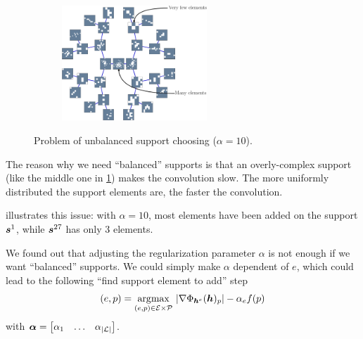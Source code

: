 \begin{figure}[!ht] \centering
\begin{subfigure}[b]{1\textwidth}\centering
\includegraphics[width=0.6\textwidth]{figures/tree-unbalanced-supp/tree-unbalanced.pdf}
\end{subfigure}
\caption{Problem of unbalanced support choosing ($\alpha=10$).}\label{fig_unbalanced_supports}
\end{figure}


\noindent
The reason why we need “balanced” supports is that an overly-complex support (like the middle one in \cref{fig_unbalanced_supports}) makes the convolution slow. The more uniformly distributed the support elements are, the faster the convolution.


\noindent
{} illustrates this issue: with $\alpha=10$, most elements have been added on the support $\bm{s}^1$, while $\bm{s}^{27}$ has only 3 elements.

\noindent
We found out that adjusting the regularization parameter $\alpha$ is not enough if we want “balanced” supports. We could simply make $\alpha$ dependent of $e$, which could lead to the following “find support element to add” step
\begin{equation}
(e,p) = \underset{(e,p) \in \mathcal E \times \mathcal P}{\operatorname*{\arg\!\max}}~ |\nabla \Phi_{\bm{h}^e}(\bm{h})_p| - \alpha_e f(p)
\end{equation}
with $\bm{\alpha} = \begin{bmatrix}\alpha_1 & \dots & \alpha_{|\mathcal L|}\end{bmatrix}$.

